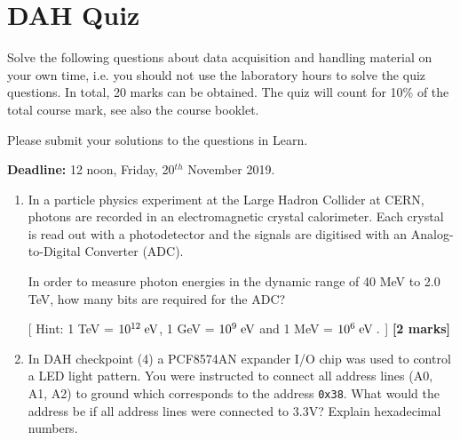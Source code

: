 \chapter{DAH Quiz}
\label{sec:quiz}

Solve the following questions about data acquisition and handling material on your own time,
i.e. you should not use the laboratory hours to solve the quiz questions. 
In total, 20 marks can be obtained.
The quiz will count for 10\% of the total course mark, see also the course booklet.

Please submit your solutions to the questions in Learn.

{\bf Deadline:} 12 noon, Friday, 20$^{th}$ November 2019.

\begin{enumerate}

\item In a particle physics experiment at the Large Hadron Collider at CERN, photons are recorded in an electromagnetic crystal calorimeter.
Each crystal is read out with a photodetector and the signals are digitised with an Analog-to-Digital Converter (ADC).
%

In order to measure photon energies in the dynamic range of 40 MeV to 2.0 TeV, how many bits are required for the ADC?

[ Hint: 1 TeV = $10^{12}\; \rm eV$, 1 GeV = $10^9\; \rm eV$ and 1 MeV = $10^6\; \rm eV\; .$ ]
%
\hfill {\bf [2 marks]}\\

\item In DAH checkpoint (4) a PCF8574AN expander I/O chip was used to control a LED light pattern.
You were instructed to connect all address lines (A0, A1, A2) to ground which corresponds to the address {\tt 0x38}.
What would the address be if all address lines were connected to 3.3V?
Explain hexadecimal numbers. 


\end{enumerate}

